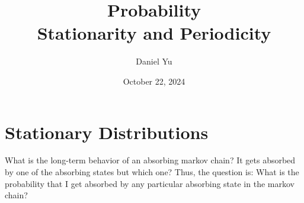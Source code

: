 \documentclass[a4paper]{article}
\title{\Huge{Probability}\\ Stationarity and Periodicity}
\author{\huge{Daniel Yu}}
\date{October 22, 2024}
\begin{document}
\maketitle
\newpage%
\tableofcontents
\pagebreak

\section{Stationary Distributions}
\begin{note}
  What is the long-term behavior of an absorbing markov chain? It gets absorbed by one of the absorbing states but which one? Thus, the question is: What is the probability that I get absorbed by any particular absorbing state in the markov chain?
\end{note}
\end{document}
